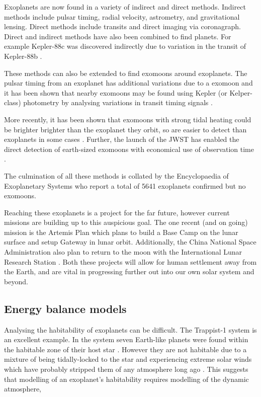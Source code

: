 \documentclass[12pt, onecolumn]{revtex4-2}    %
\begin{document}
Exoplanets are now found in a variety of indirect and direct methods.
Indirect methods include pulsar timing, radial velocity, astrometry, and gravitational lensing.
Direct methods include transits and direct imaging via coronagraph.
Direct and indirect methods have also been combined to find planets. 
For example Kepler-88c was discovered indirectly due to variation in the transit of Kepler-88b \cite{Nesvorny2013}.

These methods can also be extended to find exomoons around exoplanets.
The pulsar timing from an exoplanet has additional variations due to a exomoon \cite{Lewis2008} and it has been shown that nearby exomoons may be found using Kepler (or Kelper-class) photometry by analysing variations in transit timing signals \cite{KSG2009}.

More recently, it has been shown that exomoons with strong tidal heating could be brighter brighter than the exoplanet they orbit, so are easier to detect than exoplanets in some cases \cite{LimTurn2013}.
Further, the launch of the JWST has enabled the direct detection of earth-sized exomoons with economical use of observation time \cite{Limbach2021}.

The culmination of all these methods is collated by the Encyclopaedia of Exoplanetary Systems \cite{ExoEu} who report a total of 5641 exoplanets confirmed but no exomoons.

Reaching these exoplanets is a project for the far future, however current missions are building up to this auspicious goal.
The one recent (and on going) mission is the Artemis Plan \cite{NASA_Artemis} which plans to build a Base Camp on the lunar surface and setup Gateway in lunar orbit.
Additionally, the China National Space Administration also plan to return to the moon with the International Lunar Research Station \cite{CNSA_ILRS}.
Both these projects will allow for human settlement away from the Earth, and are vital in progressing further out into our own solar system and beyond.

\subsection{Energy balance models}
Analysing the habitability of exoplanets can be difficult.
The Trappist-1 system is an excellent example. In the system seven Earth-like planets were found within the habitable zone of their host star \cite{GTD2017}.
However they are not habitable due to a mixture of being tidally-locked to the star and experiencing extreme solar winds which have probably stripped them of any atmosphere long ago \cite{Cohen2024, VanLooveren2024}.
This suggests that modelling of an exoplanet's habitability requires modelling of the dynamic atmosphere,
\end{document}
